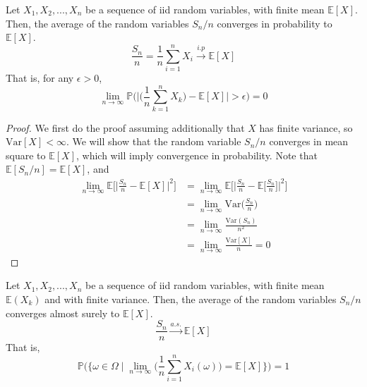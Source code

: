 \documentclass{article}
\begin{document}
    \begin{theorem}
      Let $X_1, X_2, ..., X_n$ be a sequence of iid random variables, with finite mean $\mathbb{E}[X]$. Then, the average of the random variables $S_n / n$ converges in probability to $\mathbb{E}[X]$. 
      \begin{equation}
        \frac{S_n}{n} = \frac{1}{n} \sum_{i=1}^n X_i \xrightarrow{i.p} \mathbb{E}[X]
      \end{equation}
      That is, for any $\epsilon > 0$, 
      \begin{equation}
        \lim_{n \rightarrow \infty} \mathbb{P} \bigg( \bigg| \Big( \frac{1}{n} \sum_{k=1}^n X_k \Big) - \mathbb{E}[X] \bigg| > \epsilon \bigg) = 0
      \end{equation}
    \end{theorem}
    \begin{proof}
      We first do the proof assuming additionally that $X$ has finite variance, so $\mathrm{Var}[X] < \infty$. We will show that the random variable $S_n/n$ converges in mean square to $\mathbb{E}[X]$, which will imply convergence in probability. Note that $\mathbb{E}[S_n / n] = \mathbb{E}[X]$, and 
      \begin{align*}
        \lim_{n \rightarrow \infty} \mathbb{E} \bigg[ \bigg| \frac{S_n}{n} - \mathbb{E}[X] \bigg|^2 \bigg] & = \lim_{n \rightarrow \infty} \mathbb{E} \bigg[ \bigg| \frac{S_n}{n} - \mathbb{E}\Big[\frac{S_n}{n}\Big] \bigg|^2 \bigg] \\
        & = \lim_{n \rightarrow \infty} \mathrm{Var}\Big( \frac{S_n}{n} \Big) \\
        & = \lim_{n \rightarrow \infty} \frac{\mathrm{Var}(S_n)}{n^2} \\
        & = \lim_{n \rightarrow \infty} \frac{\mathrm{Var}[X]}{n} = 0
      \end{align*}
    \end{proof}

    \begin{theorem}
      Let $X_1, X_2, ..., X_n$ be a sequence of iid random variables, with finite mean $\mathbb{E}(X_k)$ and with finite variance. Then, the average of the random variables $S_n / n$ converges almost surely to $\mathbb{E}[X]$. 
      \begin{equation}
        \frac{S_n}{n} \xrightarrow{a.s.} \mathbb{E}[X]
      \end{equation}
      That is, 
      \begin{equation}
        \mathbb{P} \bigg( \Big\{ \omega \in \Omega \mid \lim_{n \rightarrow \infty} \Big( \frac{1}{n} \sum_{i=1}^n X_i (\omega) \Big) = \mathbb{E}[X] \Big\} \bigg) = 1
      \end{equation}
    \end{theorem}
\end{document}
